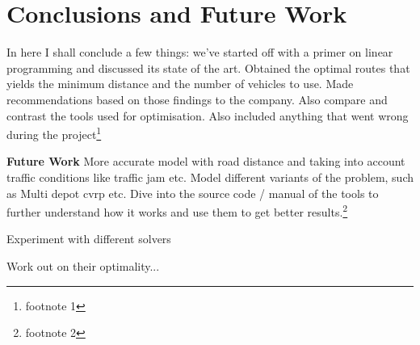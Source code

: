 \chapter{Conclusions and Future Work}
In here I shall conclude a few things: we've started off with a primer on linear programming and discussed its state
 of the art. Obtained the optimal routes that yields the minimum distance and the number of vehicles to use. Made
 recommendations based on those findings to the company. Also compare and contrast the tools used for optimisation. Also
 included anything that went wrong during the project\footnote{footnote 1}

\textbf{Future Work}
More accurate model with road distance and taking into account traffic conditions like traffic jam etc. Model
 different variants of the problem, such as Multi depot cvrp etc. Dive into the source  code / manual of
 the tools to further understand how it works and use them to get better results.\footnote{footnote 2}

 Experiment with different solvers

 Work out on their optimality...